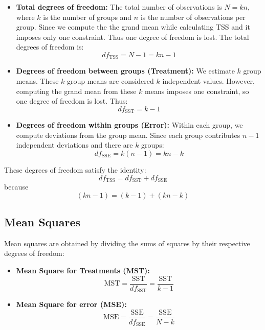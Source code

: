 \documentclass[twoside]{book}
\begin{document}
\begin{itemize}
  \item \textbf{Total degrees of freedom:} The total number of observations is \( N = kn \), where \( k \) is the number of groups and \( n \) is the number of observations per group. Since we compute the the grand mean while calculating TSS and it imposes only one constraint. Thus one degree of freedom is lost. The total degrees of freedom is:
  \[
  {df}_{\text{TSS}} = N - 1 = kn - 1
  \]

  \item \textbf{Degrees of freedom between groups (Treatment):} We estimate \( k \) group means. These \( k \) group means are considered \( k \) independent values. However, computing the grand mean from these \( k \) means imposes one constraint, so one degree of freedom is lost.
  Thus:
  \[
  {df}_{\text{SST}} = k - 1
  \]

  \item \textbf{Degrees of freedom within groups (Error):} Within each group, we compute deviations from the group mean. Since each group contributes \( n - 1 \) independent deviations and there are \( k \) groups:
  \[
  {df}_{\text{SSE}} = k(n - 1) = kn - k
  \]
\end{itemize}

\noindent These degrees of freedom satisfy the identity:
$${df}_{\text{TSS}} = {df}_{\text{SST}} + {df}_{\text{SSE}}$$
because
\[
(kn - 1) = (k - 1) + (kn - k)
\]


\subsection{Mean Squares}

Mean squares are obtained by dividing the sums of squares by their respective degrees of freedom:
\begin{itemize}
\item \textbf{Mean Square for Treatments (MST):}
\begin{equation*}
\text{MST} = \dfrac{\text{SST}}{df_{\text{SST}}}= \dfrac{\text{SST}}{k-1}
\end{equation*}

\item \textbf{Mean Square for error (MSE):}
\begin{equation*}
\text{MSE} = \dfrac{\text{SSE}}{df_{\text{SSE}}}= \dfrac{\text{SSE}}{N-k}
\end{equation*}
\end{itemize}
\end{document}
